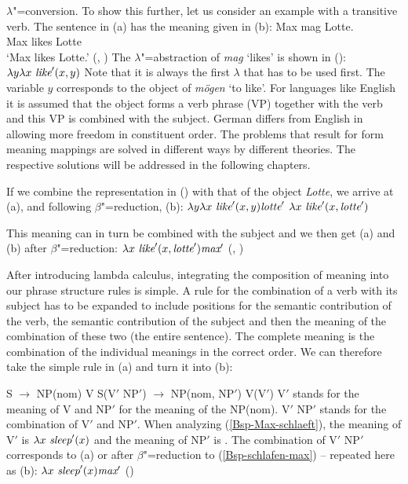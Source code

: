 $\lambda$"=conversion. To show this further, let us consider an example with a transitive verb. The sentence
in (a) has the meaning given in (b):
\eal
\ex\label{Bsp-Max-mag-Lotte} 
\gll Max mag Lotte.\\
     Max likes Lotte\\
\glt `Max likes Lotte.'
\ex {}(, )
\zl
The $\lambda$"=abstraction of \emph{mag} `likes' is shown in ():
\ea
$\lambda y \lambda x~\textit{like}'(x, y)$
\z
Note that it is always the first $\lambda$ that has to be used first. The variable $y$ corresponds
to the object of \emph{mögen} `to like'. For languages like English it is assumed that the object forms a verb
phrase (VP) together with the verb and this VP is combined with the subject. German differs from
English in allowing more freedom in constituent order. The problems that result for form meaning
mappings are solved in different ways by different theories. The respective solutions will be
addressed in the following chapters.


If we combine the representation in () with that of the object \emph{Lotte}, we arrive at (a), and following
$\beta$"=reduction, (b):
\eal
\label{lambda-moegen}
\ex $\lambda y \lambda x~\textit{like}'(x, y) \textit{lotte}'$
\ex $\lambda x~\textit{like}'(x, \textit{lotte}')$
\zl

\noindent
This meaning can in turn be combined with the subject and we then get (a) and (b) after $\beta$"=reduction:
\eal
\ex $\lambda x~\textit{like}'(x, \textit{lotte}') \textit{max}'$
\ex {}(, )
\zl

\begin{sloppypar}
\noindent
After introducing lambda calculus, integrating the composition of meaning into our phrase structure rules is simple. A rule for the
combination of a verb with its subject has to be expanded to include positions for the semantic contribution of the verb, the semantic
contribution of the subject and then the meaning of the combination of these two (the entire sentence). The complete meaning is the
combination of the individual meanings in the correct order. We can therefore take the simple rule in (a) and turn it into 
(b):
\end{sloppypar}
\eal
\ex S $\to$ NP(nom) V
\ex S(V$'$ NP$'$) $\to$ NP(nom, NP$'$) V(V$'$)
\zl
V$'$ stands for the meaning of V and NP$'$ for the meaning of the NP(nom). V$'$ NP$'$ stands for the combination of V$'$ and NP$'$. When analyzing
(\ref{Bsp-Max-schlaeft}), the meaning of V$'$ is $\lambda x~\textit{sleep}'(x)$ and the meaning of NP$'$ is . The combination of V$'$ NP$'$
corresponds to (a) or after $\beta$"=reduction to (\ref{Bsp-schlafen-max}) -- repeated here as (b):
\eal
\ex $\lambda x~\textit{sleep}'(x) \textit{max}'$
\ex {}()
\zl

